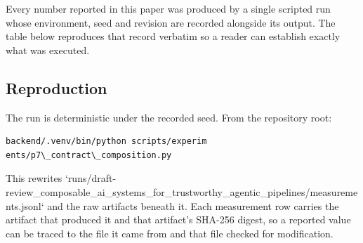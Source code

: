 \documentclass[10pt,journal,compsoc,twocolumn]{IEEEtran}
\begin{document}
Every number reported in this paper was produced by a single scripted run whose environment, seed and revision are recorded alongside its output. The table below reproduces that record verbatim so a reader can establish exactly what was executed.
\begin{table}[htbp]
\centering
{}
\end{table}


\subsection{Reproduction}


The run is deterministic under the recorded seed. From the repository root:


\begin{scriptsize}
\begin{verbatim}
backend/.venv/bin/python scripts/experim
ents/p7\_contract\_composition.py
\end{verbatim}
\end{scriptsize}


This rewrites `runs/draft-review\_composable\_ai\_systems\_for\_trustworthy\_agentic\_pipelines/measurements.jsonl` and the raw artifacts beneath it. Each measurement row carries the artifact that produced it and that artifact's SHA-256 digest, so a reported value can be traced to the file it came from and that file checked for modification.
\end{document}

